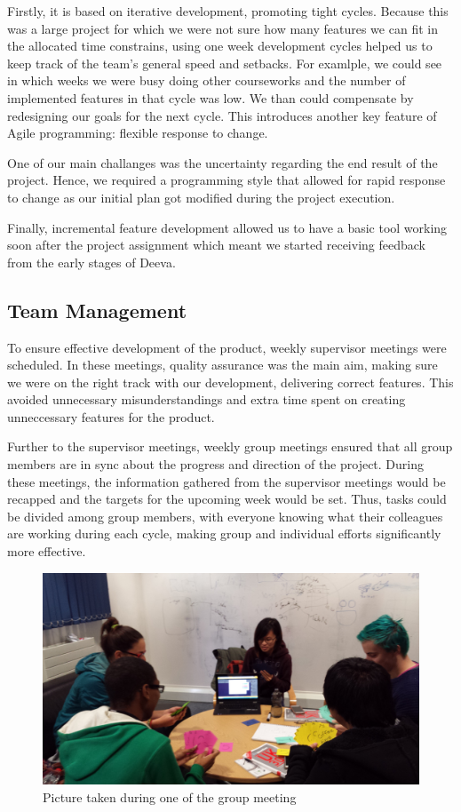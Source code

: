 \documentclass[11pt, a4paper]{article}
\begin{document}
Firstly, it is based on iterative development, promoting tight cycles. 
Because this was a large project for which we were not sure how many features we can fit in the allocated time constrains, using one week development cycles helped us to keep track of the team's general speed and setbacks. 
For examlple, we could see in which weeks we were busy doing other courseworks and the number of implemented features in that cycle was low. 
We than could compensate by redesigning our goals for the next cycle. 
This introduces another key feature of Agile programming: flexible response to change.

One of our main challanges was the uncertainty regarding the end result of the project. 
Hence, we required a programming style that allowed for rapid response to change as our initial plan got modified during the project execution.

Finally, incremental feature development allowed us to have a basic tool working soon after the project assignment which meant we started receiving feedback from the early stages of Deeva. 

\subsection{Team Management}

To ensure effective development of the product, weekly supervisor meetings were scheduled.
In these meetings, quality assurance was the main aim, making sure we were on the right track with our development, delivering correct features.
This avoided unnecessary misunderstandings and extra time spent on creating unneccessary features for the product.

Further to the supervisor meetings, weekly group meetings ensured that all group members are in sync about the progress and direction of the project.
During these meetings, the information gathered from the supervisor meetings would be recapped and the targets for the upcoming week would be set.
Thus, tasks could be divided among group members, with everyone knowing what their colleagues are working during each cycle, making group and individual efforts significantly more effective.
\begin{figure}[h!]
\centering
\includegraphics[width=130mm]{estimation.jpg}
\caption{Picture taken during one of the group meeting}
\end{figure}
\end{document}
